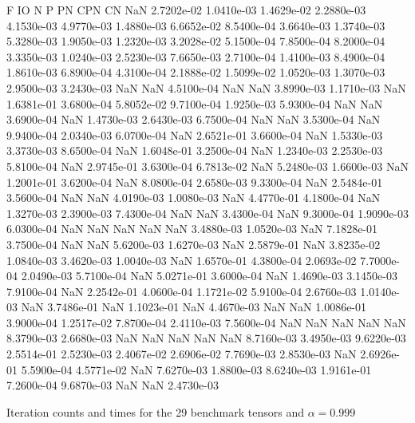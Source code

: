 \documentclass[10pt]{paper}
\begin{document}
\begin{table}
{	F IO N P PN CPN CN
          NaN   2.7202e-02   1.0410e-03   1.4629e-02   2.2880e-03   4.1530e-03   4.9770e-03
   1.4880e-03   6.6652e-02   8.5400e-04   3.6640e-03   1.3740e-03   5.3280e-03   1.9050e-03
   1.2320e-03   3.2028e-02   5.1500e-04   7.8500e-04   8.2000e-04   3.3350e-03   1.0240e-03
   2.5230e-03   7.6650e-03   2.7100e-04   1.4100e-03   8.4900e-04   1.8610e-03   6.8900e-04
   4.3100e-04   2.1888e-02   1.5099e-02   1.0520e-03   1.3070e-03   2.9500e-03   3.2430e-03
          NaN          NaN   4.5100e-04          NaN          NaN   3.8990e-03   1.1710e-03
          NaN   1.6381e-01   3.6800e-04   5.8052e-02   9.7100e-04   1.9250e-03   5.9300e-04
          NaN          NaN   3.6900e-04          NaN   1.4730e-03   2.6430e-03   6.7500e-04
          NaN          NaN   3.5300e-04          NaN   9.9400e-04   2.0340e-03   6.0700e-04
          NaN   2.6521e-01   3.6600e-04          NaN   1.5330e-03   3.3730e-03   8.6500e-04
          NaN   1.6048e-01   3.2500e-04          NaN   1.2340e-03   2.2530e-03   5.8100e-04
          NaN   2.9745e-01   3.6300e-04   6.7813e-02          NaN   5.2480e-03   1.6600e-03
          NaN   1.2001e-01   3.6200e-04          NaN   8.0800e-04   2.6580e-03   9.3300e-04
          NaN   2.5484e-01   3.5600e-04          NaN          NaN   4.0190e-03   1.0080e-03
          NaN   4.4770e-01   4.1800e-04          NaN   1.3270e-03   2.3900e-03   7.4300e-04
          NaN          NaN   3.4300e-04          NaN   9.3000e-04   1.9090e-03   6.0300e-04
          NaN          NaN          NaN          NaN          NaN   3.4880e-03   1.0520e-03
          NaN   7.1828e-01   3.7500e-04          NaN          NaN   5.6200e-03   1.6270e-03
          NaN   2.5879e-01          NaN   3.8235e-02   1.0840e-03   3.4620e-03   1.0040e-03
          NaN   1.6570e-01   4.3800e-04   2.0693e-02   7.7000e-04   2.0490e-03   5.7100e-04
          NaN   5.0271e-01   3.6000e-04          NaN   1.4690e-03   3.1450e-03   7.9100e-04
          NaN   2.2542e-01   4.0600e-04   1.1721e-02   5.9100e-04   2.6760e-03   1.0140e-03
          NaN   3.7486e-01          NaN   1.1023e-01          NaN   4.4670e-03          NaN
          NaN   1.0086e-01   3.9000e-04   1.2517e-02   7.8700e-04   2.4110e-03   7.5600e-04
          NaN          NaN          NaN          NaN          NaN   8.3790e-03   2.6680e-03
          NaN          NaN          NaN          NaN          NaN   8.7160e-03   3.4950e-03
   9.6220e-03   2.5514e-01   2.5230e-03   2.4067e-02   2.6906e-02   7.7690e-03   2.8530e-03
          NaN   2.6926e-01   5.5900e-04   4.5771e-02          NaN   7.6270e-03   1.8800e-03
   8.6240e-03   1.9161e-01   7.2600e-04   9.6870e-03          NaN          NaN   2.4730e-03
   }	
	\caption{Iteration counts and times for the 29 benchmark tensors and $\alpha = 0.999$} \label{lasttable}
\end{table}
\end{document}

